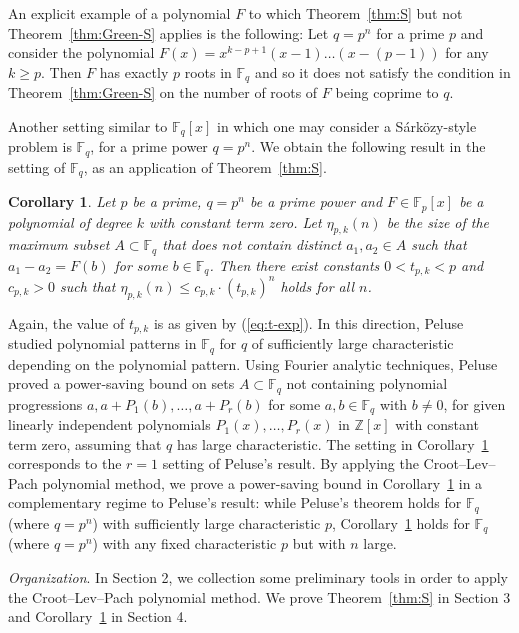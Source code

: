\documentclass[11pt, reqno]{amsart}
\newtheorem{corollary}[theorem]{Corollary}
\theoremstyle{definition}
\newcommand{\F}{\mathbb{F}}
\newcommand{\Z}{\mathbb{Z}}
\begin{document}
An explicit example of a polynomial $F$ to which Theorem~\ref{thm:S} but not Theorem~\ref{thm:Green-S} applies is the following: Let $q = p^n$ for a prime $p$ and consider the polynomial $F(x) = x^{k-p+1}(x-1)\ldots (x-(p-1))$ for any $k\ge p$. Then $F$ has exactly $p$ roots in $\mathbb{F}_q$ and so it does not satisfy the  condition in Theorem~\ref{thm:Green-S} on the number of roots of $F$ being coprime to $q$.

Another setting similar to $\F_q[x]$ in which one may consider a S\'ark\"ozy-style problem is $\F_{q}$, for a prime power $q = p^n$. We obtain the following result in the setting of $\F_q$, as an application of Theorem~\ref{thm:S}. 

\begin{corollary}\label{cor:Fq}
Let $p$ be a prime, $q = p^n$ be a prime power and $F \in \F_{p}[x]$ be a polynomial of degree $k$ with constant term zero. Let $\eta_{p,k}(n)$ be the size of the maximum subset $A \subset \F_q$ that does not contain distinct $a_1,a_2 \in A$ such that $a_1 - a_2 = F(b)$ for some $b \in \F_q$. Then there exist constants $0<t_{p,k} < p$ and $c_{p,k} > 0$ such that $ \eta_{p,k}(n) \le c_{p,k}\cdot (t_{p,k})^n$ holds for all $n$.
\end{corollary}

Again, the value of $t_{p,k}$ is as given by (\ref{eq:t-exp}). In this direction, Peluse \cite{P18, P19} studied polynomial patterns in $\F_q$ for $q$ of sufficiently large characteristic depending on the polynomial pattern. Using Fourier analytic techniques, Peluse \cite{P18} proved a power-saving bound on sets $A \subset \F_q$ not containing polynomial progressions $a, a+P_1(b), \ldots, a + P_r(b)$ for some $a,b \in \F_q$ with $b\neq 0$, for given linearly independent polynomials $P_1(x), \ldots, P_r(x)$ in $\Z[x]$ with constant term zero, assuming that $q$ has large characteristic. The setting in Corollary~\ref{cor:Fq} corresponds to the $r=1$ setting of Peluse's result. By applying the Croot--Lev--Pach polynomial method, we prove a power-saving bound in Corollary~\ref{cor:Fq} in a complementary regime to Peluse's result: while Peluse's theorem holds for $\F_q$ (where $q = p^n$) with sufficiently large characteristic $p$, Corollary~\ref{cor:Fq} holds for $\F_q$ (where $q = p^n$) with any fixed characteristic $p$ but with $n$ large.

\medskip
\textit{Organization}. In Section 2, we collection some preliminary tools in order to apply the Croot--Lev--Pach polynomial method. We prove Theorem~\ref{thm:S} in Section 3 and Corollary~\ref{cor:Fq} in Section 4. 
\end{document}

